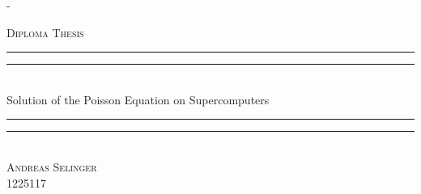 %
%
% 
%
%
\begin{titlingpage}
\begin{SingleSpace}
\calccentering{\unitlength} 
\begin{adjustwidth*}{\unitlength}{-\unitlength}
\vspace*{0mm}
\begin{center}
{\Large \textsc{Diploma Thesis}}\\[4mm]
\vspace*{15mm}
\rule[0.5ex]{\linewidth}{2pt}\vspace*{-\baselineskip}\vspace*{3.2pt}
\rule[0.5ex]{\linewidth}{1pt}\\[\baselineskip]
{\HUGE Solution of the Poisson Equation on Supercomputers}\\[4mm]
\rule[0.5ex]{\linewidth}{1pt}\vspace*{-\baselineskip}\vspace{3.2pt}
\rule[0.5ex]{\linewidth}{2pt}\\
\vspace{6.5mm}
{\large\textsc{Andreas Selinger}\\\vspace{1.5mm}1225117}\\
\vspace{11mm}

\end{center}
\end{adjustwidth*}
\end{SingleSpace}
\end{titlingpage}
